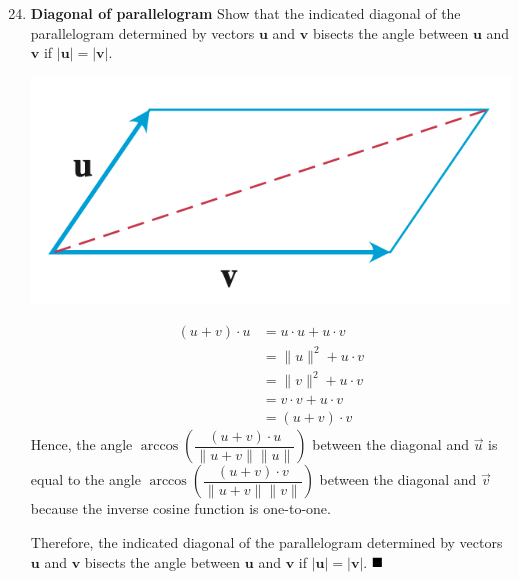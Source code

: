 \documentclass{report}
\begin{document}
\begin{enumerate}
          \setcounter{enumi}{23}
    \item \textbf{Diagonal of parallelogram} Show that the indicated diagonal of the parallelogram
          determined by vectors $\mathbf{u}$ and $\mathbf{v}$ bisects the angle between
          $\mathbf{u}$ and $\mathbf{v}$ if $|\mathbf{u}|=|\mathbf{v}|$.
          \begin{center}
              \includegraphics[scale=0.5]{assets/thomas12.3q24.png}
          \end{center}
          \begin{align*}
              (u + v) \cdot u & = u \cdot u + u \cdot v         \\
                              & = \lVert u \rVert^2 + u \cdot v \\
                              & = \lVert v \rVert^2 + u \cdot v \\
                              & = v \cdot v + u \cdot v         \\
                              & = (u + v) \cdot v
          \end{align*}
          Hence, the angle $\arccos\left(\dfrac{(u + v) \cdot u}{\lVert u + v \rVert \lVert u \rVert}\right)$ between the diagonal and $\vec{u}$ is equal to the angle $\arccos\left(\dfrac{(u + v) \cdot v}{\lVert u + v \rVert \lVert v \rVert}\right)$ between the diagonal and $\vec{v}$ because the inverse cosine function is one-to-one.

          Therefore, the indicated diagonal of the parallelogram determined by vectors
          $\mathbf{u}$ and $\mathbf{v}$ bisects the angle between $\mathbf{u}$ and
          $\mathbf{v}$ if $|\mathbf{u}|=|\mathbf{v}|$. $\hfill\blacksquare$


\end{enumerate}
\end{document}
